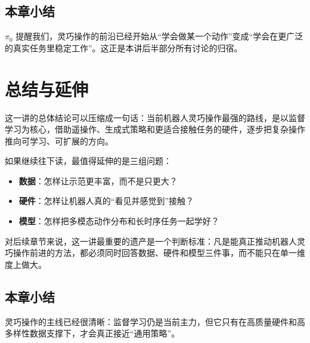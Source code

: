 \documentclass[a4paper]{article}
\begin{document}
\subsection{本章小结}

\(\pi_0\) 提醒我们，灵巧操作的前沿已经开始从“学会做某一个动作”变成“学会在更广泛的真实任务里稳定工作”。这正是本讲后半部分所有讨论的归宿。

\section{总结与延伸}

这一讲的总体结论可以压缩成一句话：当前机器人灵巧操作最强的路线，是以监督学习为核心，借助遥操作、生成式策略和更适合接触任务的硬件，逐步把复杂操作推向可学习、可扩展的方向。

如果继续往下读，最值得延伸的是三组问题：
\begin{itemize}
  \item \textbf{数据}：怎样让示范更丰富，而不是只更大？
  \item \textbf{硬件}：怎样让机器人真的“看见并感觉到”接触？
  \item \textbf{模型}：怎样把多模态动作分布和长时序任务一起学好？
\end{itemize}

对后续章节来说，这一讲最重要的遗产是一个判断标准：凡是能真正推动机器人灵巧操作前进的方法，都必须同时回答数据、硬件和模型三件事，而不能只在单一维度上做大。

\subsection{本章小结}

灵巧操作的主线已经很清晰：监督学习仍是当前主力，但它只有在高质量硬件和高多样性数据支撑下，才会真正接近“通用策略”。
\end{document}
